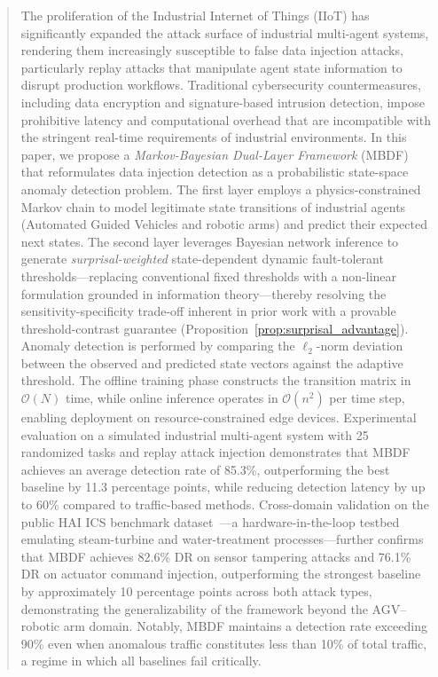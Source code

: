 \documentclass[manuscript,screen,review]{acmart}
\begin{document}
\begin{abstract}
The proliferation of the Industrial Internet of Things (IIoT) has
significantly expanded the attack surface of industrial multi-agent
systems, rendering them increasingly susceptible to false data
injection attacks, particularly replay attacks that manipulate
agent state information to disrupt production workflows. Traditional
cybersecurity countermeasures, including data encryption and
signature-based intrusion detection, impose prohibitive latency and
computational overhead that are incompatible with the stringent
real-time requirements of industrial environments. In this paper,
we propose a \textit{Markov-Bayesian Dual-Layer Framework} (MBDF)
that reformulates data injection detection as a probabilistic
state-space anomaly detection problem. The first layer employs a
physics-constrained Markov chain to model legitimate state
transitions of industrial agents (Automated Guided Vehicles and
robotic arms) and predict their expected next states. The second layer leverages Bayesian network inference to
generate \emph{surprisal-weighted} state-dependent dynamic
fault-tolerant thresholds---replacing conventional fixed
thresholds with a non-linear formulation grounded in
information theory---thereby resolving the
sensitivity-specificity trade-off inherent in prior work
with a provable threshold-contrast guarantee
(Proposition~\ref{prop:surprisal_advantage}). Anomaly
detection is performed by comparing the $\ell_2$-norm deviation
between the observed and predicted state vectors against the
adaptive threshold. The offline training phase constructs the
transition matrix in $\mathcal{O}(N)$ time, while online inference
operates in $\mathcal{O}(n^2)$ per time step, enabling deployment
on resource-constrained edge devices. Experimental evaluation on a simulated industrial multi-agent
system with 25 randomized tasks and replay attack injection
demonstrates that MBDF achieves an average detection rate of
85.3\%, outperforming the best baseline by 11.3 percentage
points, while reducing detection latency by up to 60\% compared
to traffic-based methods. Cross-domain validation on the public
HAI ICS benchmark dataset~\cite{ref_hai}---a hardware-in-the-loop
testbed emulating steam-turbine and water-treatment
processes---further confirms that MBDF achieves 82.6\% DR on
sensor tampering attacks and 76.1\% DR on actuator command
injection, outperforming the strongest baseline by approximately
10 percentage points across both attack types, demonstrating
the generalizability of the framework beyond the AGV--robotic
arm domain. Notably, MBDF maintains
a detection rate exceeding 90\% even when anomalous traffic
constitutes less than 10\% of total traffic, a regime in which
all baselines fail critically.
\end{abstract}
\end{document}
